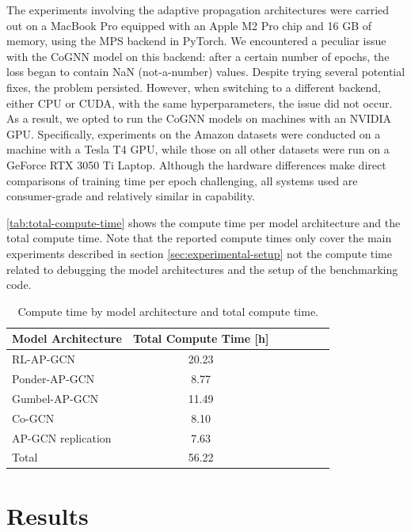 \documentclass{gdl}
\begin{document}
The experiments involving the adaptive propagation architectures were carried out on a MacBook Pro equipped with an Apple M2 Pro chip and 16 GB of memory, using the MPS backend in PyTorch. We encountered a peculiar issue with the CoGNN model on this backend: after a certain number of epochs, the loss began to contain NaN (not-a-number) values. Despite trying several potential fixes, the problem persisted. However, when switching to a different backend, either CPU or CUDA, with the same hyperparameters, the issue did not occur. As a result, we opted to run the CoGNN models on machines with an NVIDIA GPU. Specifically, experiments on the Amazon datasets were conducted on a machine with a Tesla T4 GPU, while those on all other datasets were run on a GeForce RTX 3050 Ti Laptop. Although the hardware differences make direct comparisons of training time per epoch challenging, all systems used are consumer-grade and relatively similar in capability.

\autoref{tab:total-compute-time} shows the compute time per model architecture and the total compute time. Note that the reported compute times only cover the main experiments described in section \ref{sec:experimental-setup} not the compute time related to debugging the model architectures and the setup of the benchmarking code.

\begin{table}[h]
    \small\sf
    \setlength{\tabcolsep}{2pt}
    \caption{Compute time by model architecture and total compute time.}
    \begin{tabular}{l c c c c c c}
        \toprule
        Model Architecture & Total Compute Time [h]\\
        \midrule
        RL-AP-GCN & 20.23 \\
        Ponder-AP-GCN & 8.77 \\
        Gumbel-AP-GCN & 11.49 \\
        Co-GCN & 8.10   \\
        AP-GCN replication & 7.63  \\
        \midrule
        Total & 56.22 \\
        \bottomrule
    \end{tabular}
    \label{tab:total-compute-time}
\end{table}


\section{Results}
\end{document}
